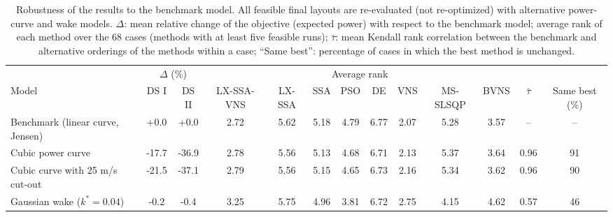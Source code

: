 \begin{table}[!t]
\centering
\caption{Robustness of the results to the benchmark model. All feasible final layouts are re-evaluated (not re-optimized) with alternative power-curve and wake models. $\Delta$: mean relative change of the objective (expected power) with respect to the benchmark model; average rank of each method over the 68 cases (methods with at least five feasible runs); $\bar\tau$: mean Kendall rank correlation between the benchmark and alternative orderings of the methods within a case; ``Same best'': percentage of cases in which the best method is unchanged.}
\label{tab:robust-hybrid}
\scriptsize\setlength{\tabcolsep}{3pt}
\begin{tabular}{lcccccccccccc}
\toprule
& \multicolumn{2}{c}{$\Delta$ (\%)} & \multicolumn{8}{c}{Average rank} & & \\
\cmidrule(lr){2-3}\cmidrule(lr){4-11}
Model & DS I & DS II & LX-SSA-VNS & LX-SSA & SSA & PSO & DE & VNS & MS-SLSQP & BVNS & $\bar\tau$ & Same best (\%) \\
\midrule
Benchmark (linear curve, Jensen) & +0.0 & +0.0 & 2.72 & 5.62 & 5.18 & 4.79 & 6.77 & 2.07 & 5.28 & 3.57 & -- & -- \\
Cubic power curve & -17.7 & -36.9 & 2.78 & 5.56 & 5.13 & 4.68 & 6.71 & 2.13 & 5.37 & 3.64 & 0.96 & 91 \\
Cubic curve with 25 m/s cut-out & -21.5 & -37.1 & 2.79 & 5.56 & 5.15 & 4.65 & 6.73 & 2.16 & 5.34 & 3.62 & 0.96 & 90 \\
Gaussian wake ($k^*=0.04$) & -0.2 & -0.4 & 3.25 & 5.75 & 4.96 & 3.81 & 6.72 & 2.75 & 4.15 & 4.62 & 0.57 & 46 \\
\bottomrule
\end{tabular}
\end{table}
